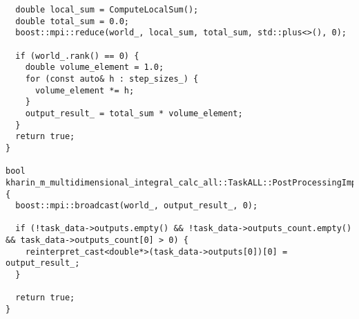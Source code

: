\documentclass[12pt]{article}
\begin{document}
\begin{lstlisting}
  double local_sum = ComputeLocalSum();
  double total_sum = 0.0;
  boost::mpi::reduce(world_, local_sum, total_sum, std::plus<>(), 0);

  if (world_.rank() == 0) {
    double volume_element = 1.0;
    for (const auto& h : step_sizes_) {
      volume_element *= h;
    }
    output_result_ = total_sum * volume_element;
  }
  return true;
}

bool kharin_m_multidimensional_integral_calc_all::TaskALL::PostProcessingImpl() {
  boost::mpi::broadcast(world_, output_result_, 0);

  if (!task_data->outputs.empty() && !task_data->outputs_count.empty() && task_data->outputs_count[0] > 0) {
    reinterpret_cast<double*>(task_data->outputs[0])[0] = output_result_;
  }

  return true;
}
\end{lstlisting}
\end{document}
